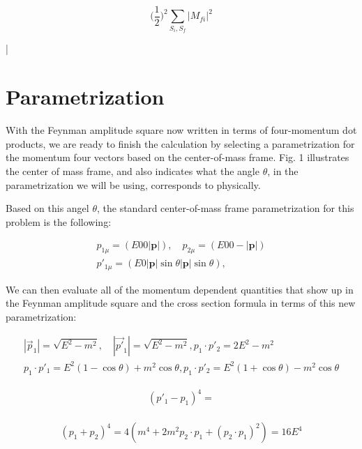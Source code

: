 \documentclass[a4]{article}
\begin{document}
    \begin{equation}
        \Big( \frac{1}{2} \Big)^2 \sum_{S_i, S_f} |M_{f i}|^2
    \end{equation}

    \begin{framed}
        |
    \end{framed}

    \section*{Parametrization}

    With the Feynman amplitude square now written in terms of four-momentum dot products, we are ready to finish the calculation by selecting a parametrization for the momentum four vectors
    based on the center-of-mass frame. Fig. 1 illustrates the center of mass frame, and also indicates what the angle $\theta$, in the parametrization we will be using, corresponds to physically.


    Based on this angel $\theta$, the standard center-of-mass frame parametrization for this problem is the following:

    \begin{eqnarray}
        p_{1 \mu} = (E 0 0 |\mathbf{p}|), \quad p_{2 \mu} = (E 0 0 - |\mathbf{p}|) \\
        p'_{1 \mu} = (E 0 |\mathbf{p}| \sin \theta |\mathbf{p}| \sin \theta), \quad 
    \end{eqnarray}

    We can then evaluate all of the momentum dependent quantities that show up in the Feynman amplitude square and the cross section formula in terms of this new parametrization:

    \begin{eqnarray}
        |\vec{p}_1| = \sqrt{E^2 - m^2}, \quad |\vec{p'}_1| = \sqrt{E^2 - m^2}, p_1 \cdot p'_2 = 2 E^2 - m^2 \\
        p_1 \cdot p'_1 = E^2 (1 - \cos \theta) + m^2 \cos \theta, p_1 \cdot p'_2 = E^2 (1 + \cos \theta) - m^2 \cos \theta
    \end{eqnarray}

    \begin{eqnarray}
        (p'_1 - p_1)^4 = \\
    \end{eqnarray}

    \begin{equation}
        (p_1 + p_2)^4 = 4 (m^4 + 2 m^2 p_2 \cdot p_1 + (p_2 \cdot p_1)^2) = 16 E^4
    \end{equation}
\end{document}
